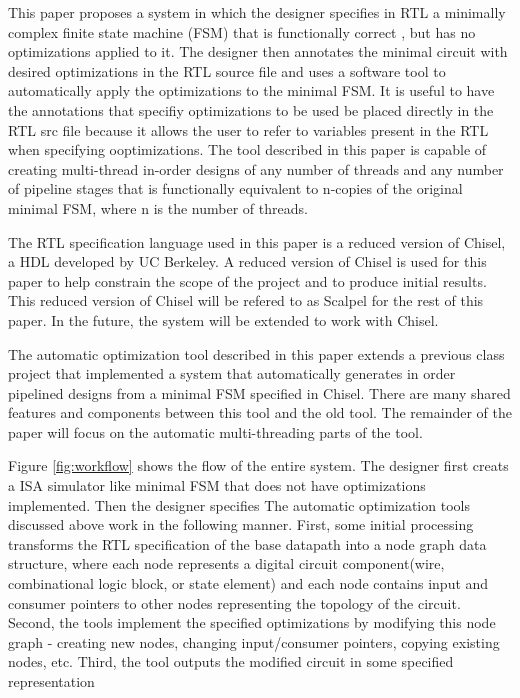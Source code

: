 This paper proposes a system in which the designer specifies in RTL a minimally complex finite state machine (FSM) that is functionally correct , but has no optimizations applied to it. The designer then annotates the minimal circuit with desired optimizations in the RTL source file and uses a software tool to automatically apply the optimizations to the minimal FSM. It is useful to have the annotations that specifiy optimizations to be used be placed directly in the RTL src file because it allows the user to refer to variables present in the RTL when specifying ooptimizations. The tool described in this paper is capable of creating multi-thread in-order designs of any number of threads and any number of pipeline stages that is functionally equivalent to n-copies of the original minimal FSM, where n is the number of threads.

The RTL specification language used in this paper is a reduced version of Chisel\cite{Bachrach:2012}, a HDL developed by UC Berkeley. A reduced version of Chisel is used for this paper to help constrain the scope of the project and to produce initial results. This reduced version of Chisel will be refered to as Scalpel for the rest of this paper. In the future, the system will be extended to work with Chisel.

The automatic optimization tool described in this paper extends a previous class project that implemented a system that automatically generates in order pipelined designs from a minimal FSM specified in Chisel. There are many shared features and components between this tool and the old tool. The remainder of the paper will focus on the automatic multi-threading parts of the tool.

Figure \ref{fig:workflow} shows the flow of the entire system. The designer first creats a ISA simulator like minimal FSM that does not have optimizations implemented. Then the designer specifies
The automatic optimization tools discussed above work in the following manner. First, some initial processing transforms the RTL specification of the base datapath into a node graph data structure, where each node represents a digital circuit component(wire, combinational logic block, or state element) and each node contains input and consumer pointers to other nodes representing the topology of the circuit. Second, the tools implement the specified optimizations by modifying this node graph - creating new nodes, changing input/consumer pointers, copying existing nodes, etc. Third, the tool outputs the modified circuit in some specified representation
 

